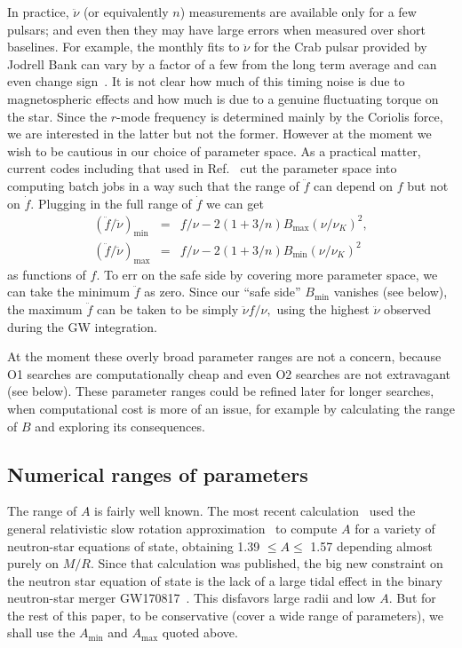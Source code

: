 \documentclass{ttuthes2007}
\begin{document}
In practice, $\ddot\nu$ (or equivalently $n$) measurements are available only
for a few pulsars; and even then they may have large errors when measured over
short baselines.
For example, the monthly fits to $\ddot\nu$ for the Crab pulsar provided by
Jodrell Bank can vary by a factor of a few from the long term average and can
even change sign~\cite{Crab2015}.
It is not clear how much of this timing noise is due to magnetospheric effects
and how much is due to a genuine fluctuating torque on the star.
Since the $r$-mode frequency is determined mainly by the Coriolis force, we
are interested in the latter but not the former.
However at the moment we wish to be cautious in our choice of parameter space.
As a practical matter, current codes including that used in
Ref.~\cite{Abbott:2018qee} cut the parameter space into computing batch jobs
in a way such that the range of $\ddot f$ can depend on $f$ but not on $\dot
f.$
Plugging in the full range of $\dot f$ we can get
\begin{eqnarray}
\left( \ddot f / \ddot\nu \right)_{\min} &=& f/\nu - 2(1+3/n) B_{\max} \left(
\nu/\nu_K \right)^2,
\\
\left( \ddot f / \ddot\nu \right)_{\max} &=& f/\nu - 2(1+3/n) B_{\min} \left(
\nu/\nu_K \right)^2
\end{eqnarray}
as functions of $f.$
To err on the safe side by covering more parameter space, we can take the
minimum $\ddot f$ as zero.
Since our ``safe side'' $B_{\min}$ vanishes (see below), the maximum $\ddot f$
can be taken to be simply $\ddot\nu f/\nu,$ using the highest $\ddot\nu$
observed during the \ac{GW} integration.

At the moment these overly broad parameter ranges are not a concern, because
\ac{O1} searches are computationally cheap and even \ac{O2} searches are not
extravagant (see below).
These parameter ranges could be refined later for longer searches, when
computational cost is more of an issue, for example by calculating the range
of $B$ and exploring its consequences.

\subsection{Numerical ranges of parameters}

The range of $A$ is fairly well known.
The most recent calculation~\cite{Idrisy:2014qca} used the general
relativistic slow rotation approximation~\cite{Lockitch:2000aa,
Lockitch:2002sy} to compute $A$ for a variety of neutron-star equations of
state, obtaining 1.39 $\le A \le$ 1.57 depending almost purely on $M/R.$
Since that calculation was published, the big new constraint on the neutron
star equation of state is the lack of a large tidal effect in the binary
neutron-star merger GW170817~\cite{TheLIGOScientific:2017qsa}.
This disfavors large radii and low $A.$
But for the rest of this paper, to be conservative (cover a wide range of
parameters), we shall use the $A_{\min}$ and $A_{\max}$ quoted above.
\end{document}
